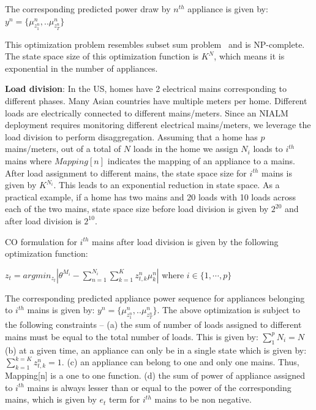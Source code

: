\documentclass[conference]{IEEEtran}
\begin{document}
\noindent The corresponding predicted power draw by $n^{th}$ appliance is given by: $y^n=\{\mu_{z_1^n}^n,..\mu_{z_T^n}^n \}$

\noindent This optimization problem resembles subset sum problem~\cite{knapsack} and is NP-complete. The state space size of this optimization function is $K^N$, which means it is exponential in the number of appliances. 


\noindent \textbf{Load division}: In the US, homes have 2 electrical mains corresponding to different phases. Many Asian countries have multiple meters per home. Different loads are electrically connected to different mains/meters. Since an NIALM deployment requires monitoring different electrical mains/meters, we leverage the load division to perform disaggregation. Assuming that a home has $p$ mains/meters, out of a total of $N$ loads in the home we assign $N_i$ loads to $i^{th}$ mains where $Mapping[n]$ indicates the mapping of an appliance to a mains.
After load assignment to different mains, the state space size for $i^{th}$ mains is given by $K^{N_i}$. This leads to an exponential reduction in state space. As a practical example, if a home has two mains and 20 loads with 10 loads across each of the two mains, state space size before load division is given by $2^{20}$ and after load division is $2^{10}$.

\noindent CO formulation for $i^{th}$ mains after load division is given by the following optimization function: 

$z_t=arg min_{z_t}|\theta^{M_i}-\sum\limits_{n=1}^{N_i}\sum\limits_{k=1}^{K}z_{t,k}^n\mu_k^n|$ where $i\in \{1,\cdots,p\}$

\noindent The corresponding predicted appliance power sequence for appliances belonging to $i^{th}$ mains is given by: $y^n=\{\mu_{z_1^n}^n,..\mu_{z_T^n}^n \}$. The above optimization is subject to the following constraints -- (a) the sum of number of loads assigned to different mains must be equal to the total number of loads. This is given by: $\sum\limits_{1}^{p}{N_i}=N$ (b) at a given time, an appliance can only be in a single state which is given by: $\sum\limits_{k=1}^{k=K} z_{t,k}^n=1$. (c) an appliance can belong to one and only one mains. Thus, Mapping[n] is a one to one function. (d) the sum of power of appliance assigned to $i^{th}$ mains is always lesser than or equal to the power of the corresponding mains, which is given by $e_t$ term for $i^{th}$ mains to be non negative.
\end{document}
